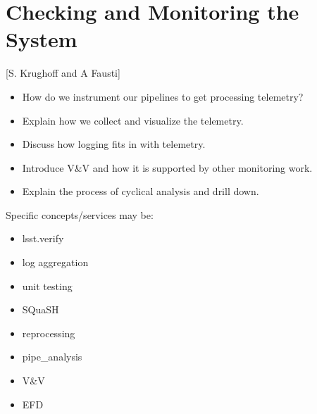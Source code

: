 \section{Checking and Monitoring the System} [S. Krughoff and A Fausti]
\begin{itemize}
\item How do we instrument our pipelines to get processing telemetry?
\item Explain how we collect and visualize the telemetry.
\item Discuss how logging fits in with telemetry.
\item Introduce V&V and how it is supported by other monitoring work.
\item Explain the process of cyclical analysis and drill down.
\end{itemize}

Specific concepts/services may be:
\begin{itemize}
\item lsst.verify
\item log aggregation
\item unit testing
\item SQuaSH
\item reprocessing
\item pipe\_analysis
\item V\&V
\item EFD
\end{itemize}
